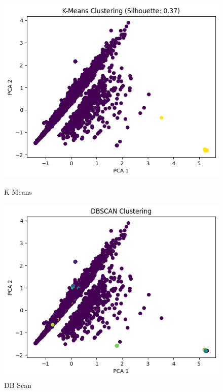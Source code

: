 \documentclass[a4paper,11pt]{article}
\begin{document}
\begin{figure}[h!]
    \centering
    \begin{minipage}{0.45\textwidth}
        \centering
        \includegraphics[width=\textwidth]{kmeam.png}
        \caption{K Means}
        \label{fig:km}
    \end{minipage}
    \hfill
    \begin{minipage}{0.45\textwidth}
        \centering
        \includegraphics[width=\textwidth]{dbscan.png}
        \caption{DB Scan}
        \label{fig:dbscan}
    \end{minipage}
\end{figure}
\end{document}
